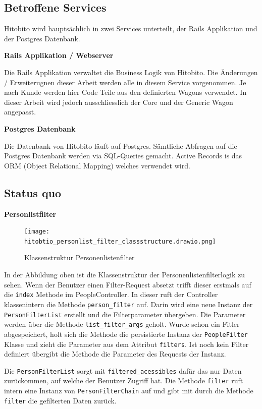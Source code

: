 \subsection{Betroffene Services}
Hitobito wird hauptsächlich in zwei Services unterteilt, der Rails Applikation und der Postgres Datenbank.

\textbf{Rails Applikation / Webserver}

Die Rails Applikation verwaltet die Business Logik von Hitobito. Die Änderungen / Erweiterugnen dieser Arbeit
werden alle in diesem Service vorgenommen. Je nach Kunde werden hier Code Teile aus den definierten Wagons verwendet.
In dieser Arbeit wird jedoch ausschliesslich der Core und der Generic Wagon angepasst.

\textbf{Postgres Datenbank}

Die Datenbank von Hitobito läuft auf Postgres. Sämtliche Abfragen auf die Postgres Datenbank werden via SQL-Queries
gemacht. Active Records is das ORM (Object Relational Mapping) welches verwendet wird.

\newpage

\subsection{Status quo}

\textbf{Personlistfilter}

\begin{figure}[h]
   \centering
   \texttt{[image: hitobtio\_personlist\_filter\_classstructure.drawio.png]}
   \caption{Klassenstruktur Personenlistenfilter}
\end{figure}

In der Abbildung oben ist die Klassenstruktur der Personenlistenfilterlogik zu sehen. Wenn der Benutzer einen Filter-Request
absetzt trifft dieser erstmals auf die \texttt{index} Methode im PeopleController. In dieser ruft der Controller klassenintern die Methode
\texttt{person\_filter} auf. Darin wird eine neue Instanz der \texttt{Person\:\:Filter\:\:List} erstellt und die Filterparameter übergeben.
Die Parameter werden über die Methode \texttt{list\_filter\_args} geholt. Wurde schon ein Fitler abgespeichert, holt sich die Methode
die persistierte Instanz der \texttt{PeopleFilter} Klasse und zieht die Parameter aus dem Attribut \texttt{filters}. Ist noch kein Filter definiert
übergibt die Methode die Parameter des Requests der Instanz. 

Die \texttt{Person\:\:Filter\:\:List} sorgt mit \texttt{filtered\_acessibles} dafür das nur Daten zurückommen, auf welche der Benutzer
Zugriff hat. Die Methode \texttt{filter} ruft intern eine Instanz von \texttt{Person\:\:Filter\:\:Chain} auf und gibt mit durch die Methode \texttt{filter} die
gefilterten Daten zurück.

